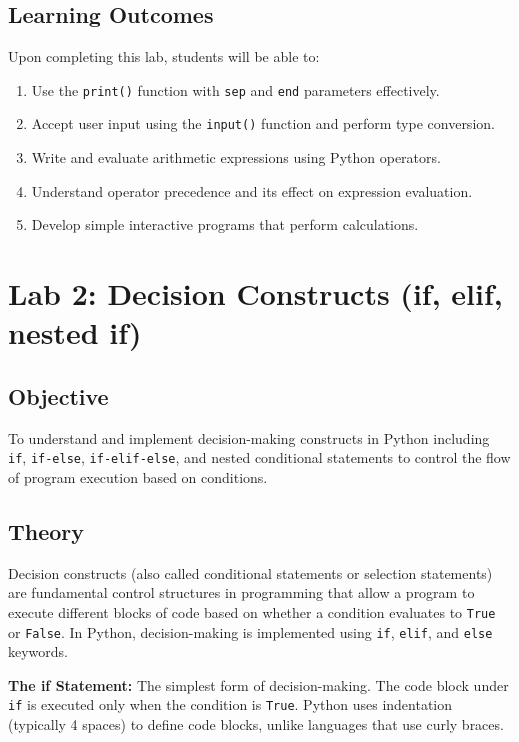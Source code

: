 \documentclass[12pt,a4paper]{article}
\begin{document}
\subsection{Learning Outcomes}
Upon completing this lab, students will be able to:
\begin{enumerate}
  \item Use the \texttt{print()} function with \texttt{sep} and \texttt{end} parameters effectively.
  \item Accept user input using the \texttt{input()} function and perform type conversion.
  \item Write and evaluate arithmetic expressions using Python operators.
  \item Understand operator precedence and its effect on expression evaluation.
  \item Develop simple interactive programs that perform calculations.
\end{enumerate}

\newpage

\section{Lab 2: Decision Constructs (if, elif, nested if)}

\subsection{Objective}
To understand and implement decision-making constructs in Python including \texttt{if}, \texttt{if-else}, \texttt{if-elif-else}, and nested conditional statements to control the flow of program execution based on conditions.

\subsection{Theory}

Decision constructs (also called conditional statements or selection statements) are fundamental control structures in programming that allow a program to execute different blocks of code based on whether a condition evaluates to \texttt{True} or \texttt{False}. In Python, decision-making is implemented using \texttt{if}, \texttt{elif}, and \texttt{else} keywords.

\textbf{The if Statement:}
The simplest form of decision-making. The code block under \texttt{if} is executed only when the condition is \texttt{True}. Python uses indentation (typically 4 spaces) to define code blocks, unlike languages that use curly braces.
\end{document}
